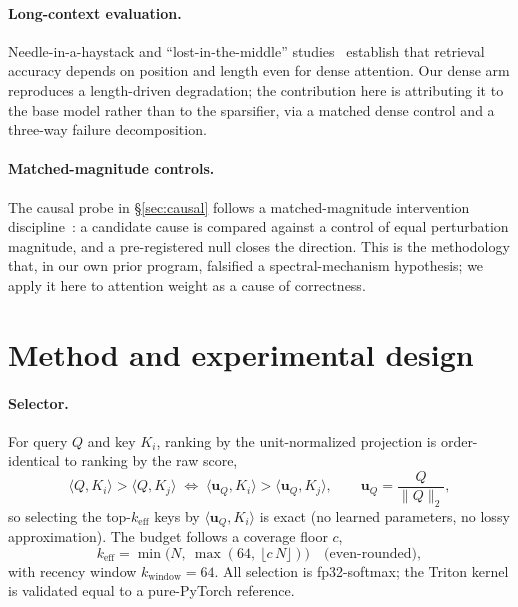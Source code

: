 \documentclass[11pt]{article}
\newcommand{\keff}{k_{\mathrm{eff}}}
\newcommand{\uQ}{\mathbf{u}_Q}
\begin{document}
\paragraph{Long-context evaluation.}
Needle-in-a-haystack and ``lost-in-the-middle'' studies~\cite{liu2024lost} establish
that retrieval accuracy depends on position and length even for dense attention.
Our dense arm reproduces a length-driven degradation; the contribution here is
attributing it to the base model rather than to the sparsifier, via a matched
dense control and a three-way failure decomposition.

\paragraph{Matched-magnitude controls.}
The causal probe in \S\ref{sec:causal} follows a matched-magnitude intervention
discipline~\cite{matchedcontrols2026}: a candidate cause is compared against a
control of equal perturbation magnitude, and a pre-registered null closes the
direction. This is the methodology that, in our own prior program, falsified a
spectral-mechanism hypothesis; we apply it here to attention weight as a cause of
correctness.

\section{Method and experimental design}
\label{sec:method}

\paragraph{Selector.}
For query $Q$ and key $K_i$, ranking by the unit-normalized projection is
order-identical to ranking by the raw score,
\begin{equation}
\langle Q,K_i\rangle > \langle Q,K_j\rangle
\;\Longleftrightarrow\;
\langle \uQ,K_i\rangle > \langle \uQ,K_j\rangle,
\qquad \uQ=\frac{Q}{\lVert Q\rVert_2},
\label{eq:thm1}
\end{equation}
so selecting the top-$\keff$ keys by $\langle\uQ,K_i\rangle$ is exact (no learned
parameters, no lossy approximation). The budget follows a coverage floor $c$,
\begin{equation}
\keff = \min\!\big(N,\ \max(64,\ \lfloor c\,N\rfloor)\big)\quad\text{(even-rounded)},
\label{eq:keff}
\end{equation}
with recency window $k_{\mathrm{window}}=64$. All selection is fp32-softmax;
the Triton kernel is validated equal to a pure-PyTorch reference.
\end{document}

